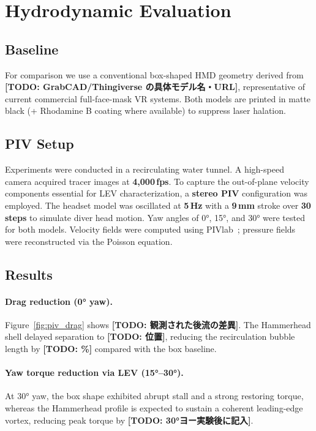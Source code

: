 \documentclass[sigconf]{acmart}
\begin{document}
\section{Hydrodynamic Evaluation}

\subsection{Baseline}
For comparison we use a conventional box-shaped HMD geometry derived from
\textbf{[TODO: GrabCAD/Thingiverse の具体モデル名・URL]},
representative of current commercial full-face-mask VR systems.
Both models are printed in matte black (+ Rhodamine B coating where available)
to suppress laser halation.

\subsection{PIV Setup}
Experiments were conducted in a recirculating water tunnel.
A high-speed camera acquired tracer images at \textbf{4{,}000\,fps}.
To capture the out-of-plane velocity components essential for LEV
characterization, a \textbf{stereo PIV} configuration was employed.
The headset model was oscillated at \textbf{5\,Hz} with a
\textbf{9\,mm} stroke over \textbf{30 steps} to simulate diver head motion.
Yaw angles of 0°, 15°, and 30° were tested for both models.
Velocity fields were computed using PIVlab~\cite{thielicke2021pivlab};
pressure fields were reconstructed via the Poisson equation.

\subsection{Results}

\paragraph{Drag reduction (0° yaw).}
Figure~\ref{fig:piv_drag} shows \textbf{[TODO: 観測された後流の差異]}.
The Hammerhead shell delayed separation to \textbf{[TODO: 位置]},
reducing the recirculation bubble length by \textbf{[TODO: \%]}
compared with the box baseline.

\paragraph{Yaw torque reduction via LEV (15°–30°).}
At 30° yaw, the box shape exhibited abrupt stall and a strong
restoring torque, whereas the Hammerhead profile is expected to sustain
a coherent leading-edge vortex, reducing peak torque
by \textbf{[TODO: 30°ヨー実験後に記入]}.
\end{document}
